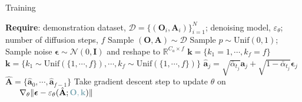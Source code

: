 \begin{algorithm}
\caption{\ourslong Training}
\label{alg:training}
\begin{algorithmic}[1]
\State
\textbf{Require}: demonstration dataset, $\mathcal{D} = \{(\textbf{O}_i, \textbf{A}_i)\}_{i=1}^N$; denoising model, $\varepsilon_\theta$; number of diffusion steps, $f$
\Repeat
    \State Sample $(\textbf{O}, \textbf{A}) \sim \mathcal{D}$
    \State Sample $p \sim \mathrm{Unif}(0, 1)$; Sample noise $\bm{\epsilon} \sim \mathcal{N}(0, \mathbf{I})$ and reshape to $\mathbb{R}^{C_a \times f}$
        \State $\mathbf{k} = \{k_1=1, \cdots, k_f=f\}$
    \Else
        \State $\mathbf{k} = \{k_1 \sim \mathrm{Unif}(\{1, \cdots, f\}), \cdots, k_f \sim \mathrm{Unif}(\{1, \cdots, f\})\}$
    \EndIf
        \State $\hat{\mathbf{a}}_j = \sqrt{\bar{\alpha}_{t_j}} \mathbf{a}_j + \sqrt{1 - \bar{\alpha}_{t_j}} \bm{\epsilon}_j$
    \EndFor
    \State $\hat{\mathbf{A}} = \{\hat{\mathbf{a}}_0, \cdots, \hat{\mathbf{a}}_{f-1}\}$
    \State Take gradient descent step to update $\theta$ on
    \State     $\quad \ \ \nabla_\theta \| \bm{\epsilon} - \varepsilon_{\theta}(\hat{\mathbf{A}}; \color{darkblue}{\mathbf{O}, \mathbf{k}}\color{black}{) \|}$
        \Comment{\textcolor{darkblue}{noise-aware conditioning}}
\end{algorithmic}
\end{algorithm}
